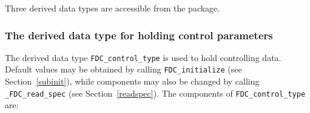 \documentclass{galahad}
\newcommand{\packagename}{FDC}
\newcommand{\fullpackagename}{\libraryname\_\-\packagename}
\begin{document}







\galtypes
Three derived data types are accessible from the package.


\subsubsection{The derived data type for holding control
 parameters}\label{typecontrol}
The derived data type
{\tt \packagename\_control\_type}
is used to hold controlling data. Default values may be obtained by calling
{\tt \packagename\_initialize}
(see Section~\ref{subinit}),
while components may also be changed by calling
{\tt \fullpackagename\_read\-\_spec}
(see Section~\ref{readspec}).
The components of
{\tt \packagename\_control\_type}
are:
\end{document}
